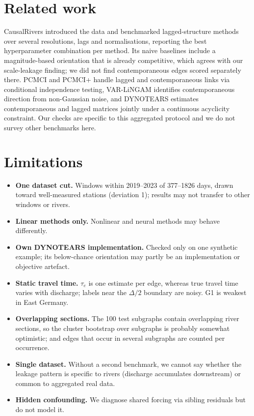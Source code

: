 \documentclass[10pt,a4paper]{article}
\newcommand{\tauE}{\tau_e}
\begin{document}
\section{Related work}
CausalRivers \citep{stein2025causalrivers} introduced the data and benchmarked lagged-structure methods over several resolutions, lags and normalisations, reporting the best hyperparameter combination per method. Its naive baselines include a magnitude-based orientation that is already competitive, which agrees with our scale-leakage finding; we did not find contemporaneous edges scored separately there. PCMCI \citep{runge2019pcmci} and PCMCI+ \citep{runge2020pcmciplus} handle lagged and contemporaneous links via conditional independence testing, VAR-LiNGAM \citep{hyvarinen2010svar} identifies contemporaneous direction from non-Gaussian noise, and DYNOTEARS \citep{pamfil2020dynotears} estimates contemporaneous and lagged matrices jointly under a continuous acyclicity constraint. Our checks are specific to this aggregated protocol and we do not survey other benchmarks here.

\section{Limitations}
\begin{itemize}
\item \textbf{One dataset cut.} Windows within 2019--2023 of 377--1826 days, drawn toward well-measured stations (deviation 1); results may not transfer to other windows or rivers.
\item \textbf{Linear methods only.} Nonlinear and neural methods may behave differently.
\item \textbf{Own DYNOTEARS implementation.} Checked only on one synthetic example; its below-chance orientation may partly be an implementation or objective artefact.
\item \textbf{Static travel time.} $\tauE$ is one estimate per edge, whereas true travel time varies with discharge; labels near the $\Delta/2$ boundary are noisy. G1 is weakest in East Germany.
\item \textbf{Overlapping sections.} The 100 test subgraphs contain overlapping river sections, so the cluster bootstrap over subgraphs is probably somewhat optimistic; and edges that occur in several subgraphs are counted per occurrence.
\item \textbf{Single dataset.} Without a second benchmark, we cannot say whether the leakage pattern is specific to rivers (discharge accumulates downstream) or common to aggregated real data.
\item \textbf{Hidden confounding.} We diagnose shared forcing via sibling residuals but do not model it.
\end{itemize}
\end{document}
